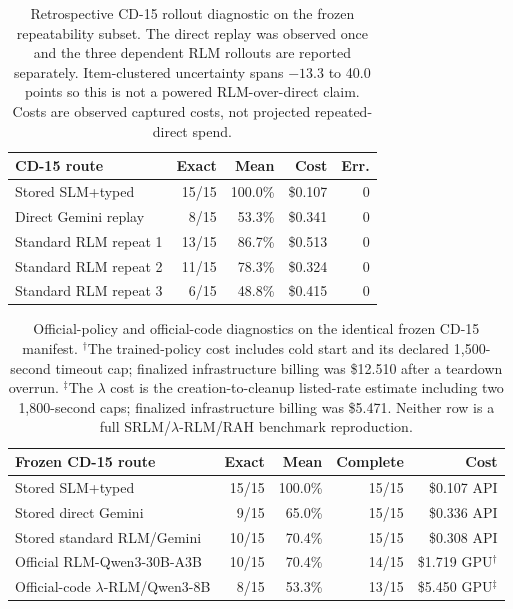 \begin{table}[!t]
\centering
\small
\setlength{\tabcolsep}{3pt}
\begin{tabular}{@{}p{7.0cm}rrrr@{}}
\toprule
\textbf{CD-15 route} & \textbf{Exact} & \textbf{Mean} & \textbf{Cost} & \textbf{Err.} \\
\midrule
Stored SLM+typed & 15/15 & 100.0\% & \$0.107 & 0 \\
Direct Gemini replay & 8/15 & 53.3\% & \$0.341 & 0 \\
Standard RLM repeat 1 & 13/15 & 86.7\% & \$0.513 & 0 \\
Standard RLM repeat 2 & 11/15 & 78.3\% & \$0.324 & 0 \\
Standard RLM repeat 3 & 6/15 & 48.8\% & \$0.415 & 0 \\
\bottomrule
\end{tabular}
\caption{Retrospective CD-15 rollout diagnostic on the frozen repeatability subset. The direct replay was observed once and the three dependent RLM rollouts are reported separately. Item-clustered uncertainty spans $-13.3$ to 40.0 points so this is not a powered RLM-over-direct claim. Costs are observed captured costs, not projected repeated-direct spend.}
\label{tab:supp-cd15-positive-lock}
\end{table}

\begin{table}[!t]
\centering
\small
\setlength{\tabcolsep}{3pt}
\begin{tabular}{@{}p{8.0cm}rrrr@{}}
\toprule
\textbf{Frozen CD-15 route} & \textbf{Exact} & \textbf{Mean} & \textbf{Complete} & \textbf{Cost} \\
\midrule
Stored SLM+typed & 15/15 & 100.0\% & 15/15 & \$0.107 API \\
Stored direct Gemini & 9/15 & 65.0\% & 15/15 & \$0.336 API \\
Stored standard RLM/Gemini & 10/15 & 70.4\% & 15/15 & \$0.308 API \\
Official RLM-Qwen3-30B-A3B & 10/15 & 70.4\% & 14/15 & \$1.719 GPU$^{\dagger}$ \\
Official-code $\lambda$-RLM/Qwen3-8B & 8/15 & 53.3\% & 13/15 & \$5.450 GPU$^{\ddagger}$ \\
\bottomrule
\end{tabular}
\caption{Official-policy and official-code diagnostics on the identical frozen CD-15 manifest. $^{\dagger}$The trained-policy cost includes cold start and its declared 1,500-second timeout cap; finalized infrastructure billing was \$12.510 after a teardown overrun. $^{\ddagger}$The $\lambda$ cost is the creation-to-cleanup listed-rate estimate including two 1,800-second caps; finalized infrastructure billing was \$5.471. Neither row is a full SRLM/$\lambda$-RLM/RAH benchmark reproduction.}
\label{tab:supp-cd15-official-qwen}
\end{table}

